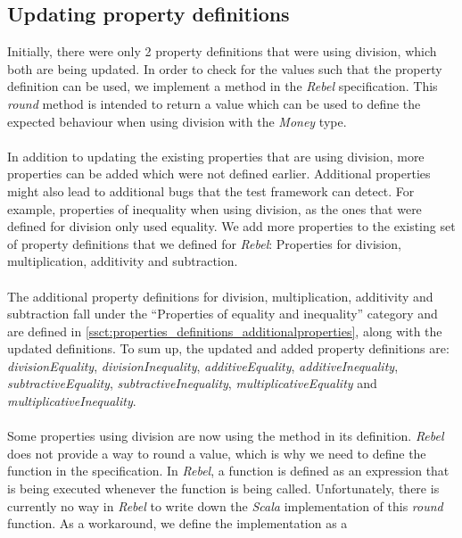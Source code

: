 \subsection{Updating property definitions}
Initially, there were only 2 property definitions that were using division,
which both are being updated. In order to check for the values such that the
property definition can be used, we implement a  method in the
\textit{Rebel} specification. This \textit{round} method is intended to return a
value which can be used to define the expected behaviour when using division
with the \textit{Money} type.\\
\\
In addition to updating the existing properties that are using division, more
properties can be added which were not defined earlier. Additional properties
might also lead to additional bugs that the test framework can detect. For
example, properties of inequality when using division, as the ones that were
defined for division only used equality. We add more properties to the existing set of property definitions that we
defined for \textit{Rebel}: Properties for division, multiplication, additivity and subtraction.\\
\\
The additional property definitions for division,
multiplication, additivity and subtraction fall under the
``Properties of equality and inequality'' category and are defined in
\autoref{ssct:properties_definitions_additionalproperties}, along with the
updated definitions. To sum up, the updated and added property definitions are:
\textit{divisionEquality}, \textit{divisionInequality},
\textit{additiveEquality}, \textit{additiveInequality},
\textit{subtractiveEquality}, \textit{subtractiveInequality},
\textit{multiplicativeEquality} and \textit{multiplicativeInequality}.\\
\\
Some properties using division are now using the  method in its
definition. \textit{Rebel} does not provide a way to round a value, which is why
we need to define the function in the specification. In \textit{Rebel}, a
function is defined as an expression that is being executed whenever the
function is being called. Unfortunately, there is currently no way in
\textit{Rebel} to write down the \textit{Scala} implementation of this
\textit{round} function. As a workaround, we define the implementation as a
